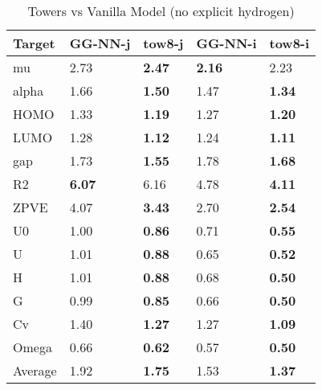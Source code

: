 \documentclass{article}
\begin{document}
\begin{table}[t]
\centering
\caption{Towers vs Vanilla Model (no explicit hydrogen)}
\label{tb:towers2}
\begin{tabular}{l|ll|ll}
\hline
Target & GG-NN-j & tow8-j & GG-NN-i & tow8-i \\
\hline
mu & 2.73        & \textbf{2.47}           & \textbf{2.16}      & 2.23         \\
alpha & 1.66        & \textbf{1.50}           & 1.47      & \textbf{1.34}         \\
HOMO & 1.33        & \textbf{1.19}           & 1.27      & \textbf{1.20}         \\
LUMO & 1.28        & \textbf{1.12}           & 1.24      & \textbf{1.11}         \\
gap & 1.73        & \textbf{1.55}           & 1.78      & \textbf{1.68}         \\
R2 & \textbf{6.07}   & 6.16           & 4.78      & \textbf{4.11}         \\
ZPVE & 4.07        & \textbf{3.43}           & 2.70      & \textbf{2.54}         \\
U0 & 1.00        & \textbf{0.86}           & 0.71      & \textbf{0.55}         \\
U & 1.01        & \textbf{0.88}           & 0.65      & \textbf{0.52}         \\
H & 1.01        & \textbf{0.88}           & 0.68      & \textbf{0.50}         \\
G & 0.99        & \textbf{0.85}           & 0.66      & \textbf{0.50}         \\
Cv & 1.40        & \textbf{1.27}           & 1.27      & \textbf{1.09}         \\
Omega & 0.66        & \textbf{0.62}           & 0.57      & \textbf{0.50}         \\
\hline
Average & 1.92 & \textbf{1.75} & 1.53 & \textbf{1.37}
\end{tabular}
\end{table}
\end{document}
